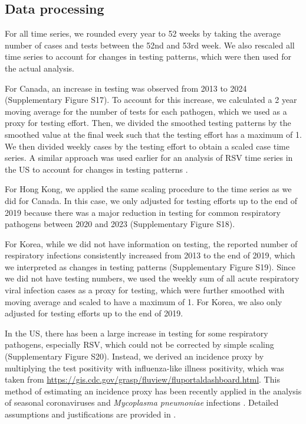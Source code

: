 \documentclass[12pt]{article}
\begin{document}
\subsection*{Data processing}

For all time series, we rounded every year to 52 weeks by taking the average number of cases and tests between the 52nd and 53rd week.
We also rescaled all time series to account for changes in testing patterns, which were then used for the actual analysis.

For Canada, an increase in testing was observed from 2013 to 2024 (Supplementary Figure S17).
To account for this increase, we calculated a 2 year moving average for the number of tests for each pathogen, which we used as a proxy for testing effort.
Then, we divided the smoothed testing patterns by the smoothed value at the final week such that the testing effort has a maximum of 1.
We then divided weekly cases by the testing effort to obtain a scaled case time series.
A similar approach was used earlier for an analysis of RSV time series in the US to account for changes in testing patterns \citep{pitzer2015environmental}.

For Hong Kong, we applied the same scaling procedure to the time series as we did for Canada.
In this case, we only adjusted for testing efforts up to the end of 2019 because there was a major reduction in testing for common respiratory pathogens between 2020 and 2023 (Supplementary Figure S18).

For Korea, while we did not have information on testing, the reported number of respiratory infections consistently increased from 2013 to the end of 2019, which we interpreted as changes in testing patterns (Supplementary Figure S19).
Since we did not have testing numbers, we used the weekly sum of all acute respiratory viral infection cases as a proxy for testing, which were further smoothed with moving average and scaled to have a maximum of 1.
For Korea, we also only adjusted for testing efforts up to the end of 2019.

In the US, there has been a large increase in testing for some respiratory pathogens, especially RSV, which could not be corrected by simple scaling (Supplementary Figure S20).
Instead, we derived an incidence proxy by multiplying the test positivity with influenza-like illness positivity, which was taken from \url{https://gis.cdc.gov/grasp/fluview/fluportaldashboard.html}.
This method of estimating an incidence proxy has been recently applied in the analysis of seasonal coronaviruses \citep{kissler2020projecting} and \textit{Mycoplasma pneumoniae} infections \citep{park2024predicting}.
Detailed assumptions and justifications are provided in \citep{goldstein2011predicting}.
\end{document}
